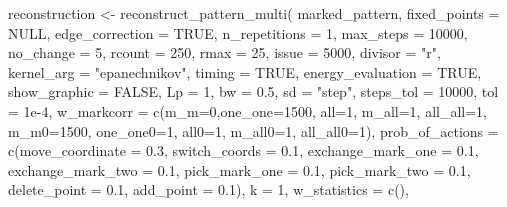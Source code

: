 \documentclass[
  letterpaper,
  DIV=11,
  numbers=noendperiod]{scrreprt}
\newenvironment{Shaded}{\begin{snugshade}}{\end{snugshade}}
\newcommand{\AttributeTok}[1]{\textcolor[rgb]{0.40,0.45,0.13}{#1}}
\newcommand{\ConstantTok}[1]{\textcolor[rgb]{0.56,0.35,0.01}{#1}}
\newcommand{\DecValTok}[1]{\textcolor[rgb]{0.68,0.00,0.00}{#1}}
\newcommand{\FloatTok}[1]{\textcolor[rgb]{0.68,0.00,0.00}{#1}}
\newcommand{\FunctionTok}[1]{\textcolor[rgb]{0.28,0.35,0.67}{#1}}
\newcommand{\NormalTok}[1]{\textcolor[rgb]{0.00,0.23,0.31}{#1}}
\newcommand{\OtherTok}[1]{\textcolor[rgb]{0.00,0.23,0.31}{#1}}
\newcommand{\StringTok}[1]{\textcolor[rgb]{0.13,0.47,0.30}{#1}}
\begin{document}
\begin{Shaded}
\begin{Highlighting}[]
\NormalTok{reconstruction }\OtherTok{\textless{}{-}} \FunctionTok{reconstruct\_pattern\_multi}\NormalTok{(}
\NormalTok{marked\_pattern,}
\AttributeTok{fixed\_points      =} \ConstantTok{NULL}\NormalTok{,}
\AttributeTok{edge\_correction   =} \ConstantTok{TRUE}\NormalTok{,     }
\AttributeTok{n\_repetitions     =} \DecValTok{1}\NormalTok{,     }
\AttributeTok{max\_steps         =} \DecValTok{10000}\NormalTok{,     }
\AttributeTok{no\_change         =} \DecValTok{5}\NormalTok{,     }
\AttributeTok{rcount            =} \DecValTok{250}\NormalTok{,     }
\AttributeTok{rmax              =} \DecValTok{25}\NormalTok{,      }
\AttributeTok{issue             =} \DecValTok{5000}\NormalTok{,       }
\AttributeTok{divisor           =} \StringTok{"r"}\NormalTok{,    }
\AttributeTok{kernel\_arg        =} \StringTok{"epanechnikov"}\NormalTok{,}
\AttributeTok{timing            =} \ConstantTok{TRUE}\NormalTok{,    }
\AttributeTok{energy\_evaluation =} \ConstantTok{TRUE}\NormalTok{,}
\AttributeTok{show\_graphic      =} \ConstantTok{FALSE}\NormalTok{,  }
\AttributeTok{Lp                =} \DecValTok{1}\NormalTok{,      }
\AttributeTok{bw                =} \FloatTok{0.5}\NormalTok{,}
\AttributeTok{sd                =} \StringTok{"step"}\NormalTok{,}
\AttributeTok{steps\_tol         =} \DecValTok{10000}\NormalTok{,   }
\AttributeTok{tol               =} \FloatTok{1e{-}4}\NormalTok{,   }
\AttributeTok{w\_markcorr        =} \FunctionTok{c}\NormalTok{(}\AttributeTok{m\_m=}\DecValTok{0}\NormalTok{,}\AttributeTok{one\_one=}\DecValTok{1500}\NormalTok{,  }\AttributeTok{all=}\DecValTok{1}\NormalTok{, }\AttributeTok{m\_all=}\DecValTok{1}\NormalTok{, }\AttributeTok{all\_all=}\DecValTok{1}\NormalTok{, }\AttributeTok{m\_m0=}\DecValTok{1500}\NormalTok{, }\AttributeTok{one\_one0=}\DecValTok{1}\NormalTok{, }\AttributeTok{all0=}\DecValTok{1}\NormalTok{, }\AttributeTok{m\_all0=}\DecValTok{1}\NormalTok{, }\AttributeTok{all\_all0=}\DecValTok{1}\NormalTok{),}
\AttributeTok{prob\_of\_actions   =} \FunctionTok{c}\NormalTok{(}\AttributeTok{move\_coordinate =} \FloatTok{0.3}\NormalTok{, }\AttributeTok{switch\_coords =} \FloatTok{0.1}\NormalTok{, }\AttributeTok{exchange\_mark\_one =} \FloatTok{0.1}\NormalTok{, }\AttributeTok{exchange\_mark\_two =} \FloatTok{0.1}\NormalTok{, }\AttributeTok{pick\_mark\_one =} \FloatTok{0.1}\NormalTok{, }\AttributeTok{pick\_mark\_two =} \FloatTok{0.1}\NormalTok{, }\AttributeTok{delete\_point =} \FloatTok{0.1}\NormalTok{, }\AttributeTok{add\_point =} \FloatTok{0.1}\NormalTok{), }
\AttributeTok{k                 =} \DecValTok{1}\NormalTok{,       }
\AttributeTok{w\_statistics      =} \FunctionTok{c}\NormalTok{(),              }

\end{Highlighting}
\end{Shaded}
\end{document}
